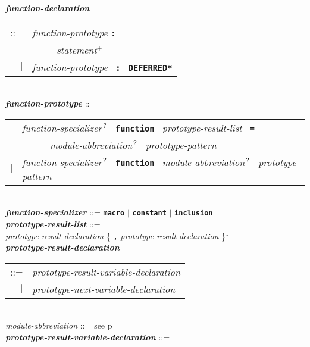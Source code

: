 \documentclass[12pt]{article}
\newcommand{\TT}[1]{{\tt \bfseries #1}}
\newcommand{\STAR}{{\Large $^\star$}}
\newcommand{\PLUS}[1][]{{$^{+#1}$}}
\newcommand{\QMARK}{{$^{\,\mbox{\footnotesize ?}}$}}
\newcommand{\ttkey}[1]{{\tt \bfseries #1}}
\newcommand{\emkey}[1]{{\em \bfseries #1}}
\newcommand{\pagref}[1]{p\pageref{#1}}
\newenvironment{indpar}[1][0.3in]%
	{\begin{list}{}%
		     {\setlength{\itemsep}{0in}%
		      \setlength{\topsep}{0in}%
		      \setlength{\parsep}{1ex}%
		      \setlength{\labelwidth}{#1}%
		      \setlength{\leftmargin}{#1}%
		      \addtolength{\leftmargin}{\labelsep}}%
	 \item}%
	{\end{list}}
\begin{document}
\begin{indpar}[0.1in]
\emkey{function-declaration}\label{FUNCTION-DECLARATION}
    \begin{tabular}[t]{rl}
    ::= &  {\em function-prototype} \TT{:} \\
	& \TT{~~~~~}{\em statement}\PLUS{} \\
    $|$ &  {\em function-prototype}~ \TT{:}~ \ttkey{*DEFERRED*} \\
    \end{tabular}
\\[2ex]
\emkey{function-prototype}\label{FUNCTION-PROTOTYPE} ::= \\
\hspace*{0.25in}
    \begin{tabular}[t]{@{}rl}
        & {\em function-specializer}\QMARK{}~ \ttkey{function}~
          {\em prototype-result-list}~ \TT{=} \\
	& \TT{~~~~~} {\em module-abbreviation}\QMARK{}~
	             {\em prototype-pattern} \\
    $|$ & {\em function-specializer}\QMARK{}~ \ttkey{function}~
          {\em module-abbreviation}\QMARK{}~ {\em prototype-pattern} \\
    \end{tabular}
\\[2ex]
\emkey{function-specializer}\label{FUNCTION-SPECIALIZER} ::=
	\TT{macro} $|$ \TT{constant} $|$ \TT{inclusion}
\\[2ex]
\emkey{prototype-result-list}\label{PROTOTYPE-RESULT-LIST} ::= \\
\hspace*{0.5in}
    {\em prototype-result-declaration}
    \{ \TT{,} {\em prototype-result-declaration} \}\STAR{}
\\[0.5ex]
\emkey{prototype-result-declaration}\label{PROTOTYPE-RESULT-DECLARATION} \\
\hspace*{0.5in}\begin{tabular}[t]{rl}
    ::= & {\em prototype-result-variable-declaration} \\
    $|$ & {\em prototype-next-variable-declaration} \\
    \end{tabular}
\\[0.5ex]
{\em module-abbreviation} ::= see \pagref{MODULE-ABBREVIATION}
\\[0.5ex]
\emkey{prototype-result-variable-declaration}%
    \label{PROTOTYPE-RESULT-VARIABLE-DECLARATION} ::= \\

\end{indpar}
\end{document}
